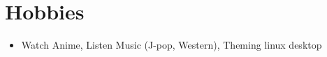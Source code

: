 \documentclass[10pt,a4paper,sans]{moderncv}        %
\begin{document}
	\section{Hobbies}

	\begin{itemize}
		
		\item  Watch Anime, Listen Music (J-pop, Western), Theming linux desktop
		
		
	\end{itemize}
%	
	
	
	
\end{document}
